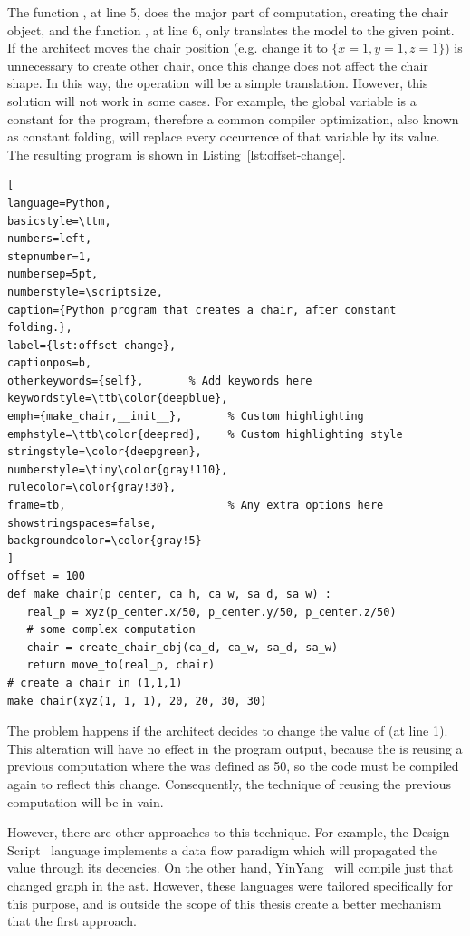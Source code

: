 The function , at line 5, does the major part of computation, creating the chair object, and the function , at line 6, only translates the model to the given point. If the architect moves the chair position (e.g. change it to $\{ x\!=\!1,y\!=\!1,z\!=\!1 \}$) is unnecessary to create other chair, once this change does not affect the chair shape. In this way, the operation will be a simple translation. However, this solution will not work in some cases. For example, the global variable  is a constant for the program, therefore a common compiler optimization, also known as constant folding, will replace every occurrence of that variable by its value. The resulting program is shown in Listing~\ref{lst:offset-change}. \\

\begin{lstlisting}[
language=Python,
basicstyle=\ttm,
numbers=left,
stepnumber=1,
numbersep=5pt,                   
numberstyle=\scriptsize, 
caption={Python program that creates a chair, after constant folding.},
label={lst:offset-change},
captionpos=b, 
otherkeywords={self},       % Add keywords here
keywordstyle=\ttb\color{deepblue},
emph={make_chair,__init__},       % Custom highlighting
emphstyle=\ttb\color{deepred},    % Custom highlighting style
stringstyle=\color{deepgreen},
numberstyle=\tiny\color{gray!110},
rulecolor=\color{gray!30},
frame=tb,                         % Any extra options here
showstringspaces=false,
backgroundcolor=\color{gray!5} 
]
offset = 100
def make_chair(p_center, ca_h, ca_w, sa_d, sa_w) :
   real_p = xyz(p_center.x/50, p_center.y/50, p_center.z/50)
   # some complex computation
   chair = create_chair_obj(ca_d, ca_w, sa_d, sa_w)
   return move_to(real_p, chair)
# create a chair in (1,1,1)
make_chair(xyz(1, 1, 1), 20, 20, 30, 30)
\end{lstlisting}

The problem happens if the architect decides to change the value of  (at line 1). This alteration will have no effect in the program output, because the  is reusing a previous computation where the  was defined as 50, so the code must be compiled again to reflect this change. Consequently, the technique of reusing the previous computation will be in vain.

However, there are other approaches to this technique. For example, the Design Script~\citep{aish2012designscript} language implements a data flow paradigm which will propagated the  value through its decencies. On the other hand, YinYang~\citep{mcdirmid2013usable} will compile just that changed graph in the \gls{ast}. However, these languages were tailored specifically for this purpose, and is outside the scope of this thesis create a better mechanism that the first approach.

